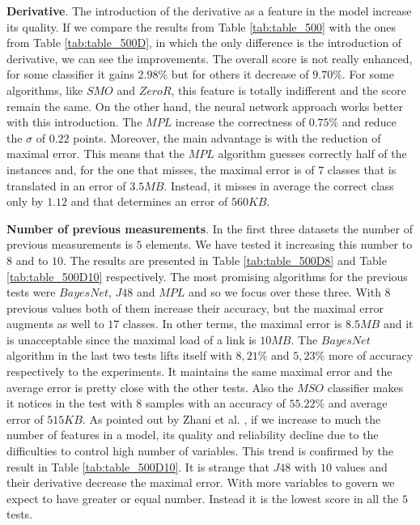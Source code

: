 \documentclass[12pt]{article}
\begin{document}
\textbf{Derivative}.
The introduction of the derivative as a feature in the model increase its quality.
If we compare the results from Table \ref{tab:table_500} with the ones from Table \ref{tab:table_500D}, in which the only difference is the introduction of derivative, we can see the improvements.
The overall score is not really enhanced, for some classifier it gains $2.98\%$ but for others it decrease of $9.70\%$.
For some algorithms, like $SMO$ and $ZeroR$, this feature is totally indifferent and the score remain the same.
On the other hand, the neural network approach works better with this introduction. The $MPL$ increase the correctness of $0.75\%$ and reduce the $\sigma$ of $0.22$ points. 
Moreover, the main advantage is with the reduction of maximal error. 
This means that the $MPL$ algorithm guesses correctly half of the instances and, for the one that misses, the maximal error is of $7$ classes that is translated in an error of $3.5MB$. 
Instead, it misses in average the correct class only by $1.12$ and that determines an error of $560KB$.


\textbf{Number of previous measurements}.
In the first three datasets the number of previous measurements is $5$ elements. 
We have tested it increasing this number to $8$ and to $10$. 
The results are presented in Table \ref{tab:table_500D8} and Table \ref{tab:table_500D10} respectively.
The most promising algorithms for the previous tests were $BayesNet$, $J48$ and $MPL$ and so we focus over these three.
With $8$ previous values both of them increase their accuracy, but the maximal error augments as well to $17$ classes. 
In other terms, the maximal error is $8.5MB$ and it is unacceptable since the maximal load of a link is $10MB$.
The $BayesNet$ algorithm in the last two tests lifts itself with $8,21\%$ and $5,23\%$ more of accuracy respectively to the experiments.
It maintains the same maximal error and the average error is pretty close with the other tests.
Also the $MSO$ classifier makes it notices in the test with $8$ samples with an accuracy of $55.22\%$ and average error of $515KB$.
As pointed out by Zhani et al. \cite{zha}, if we increase to much the number of features in a model, its quality and reliability decline due to the difficulties to control high number of variables.
This trend is confirmed by the result in Table \ref{tab:table_500D10}.
\newpage
It is strange that $J48$ with $10$ values and their derivative decrease the maximal error. 
With more variables to govern we expect to have greater or equal number.
Instead it is the lowest score in all the $5$ tests.
\end{document}
